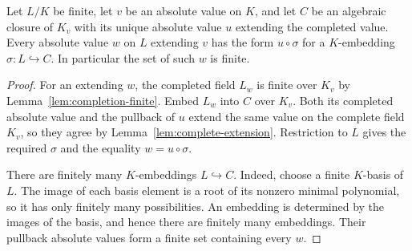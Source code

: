\begin{lemma}
\label{lem:finite-values-via-embeddings}
\leanok
{}
Let $L/K$ be finite, let $v$ be an absolute value on $K$, and let
$C$ be an algebraic closure of $K_v$ with its unique absolute value
$u$ extending the completed value. Every absolute value $w$ on $L$
extending $v$ has the form $u\circ\sigma$ for a $K$-embedding
$\sigma:L\hookrightarrow C$. In particular the set of such $w$ is finite.
\end{lemma}
\begin{proof}
For an extending $w$, the completed field $L_w$ is finite over $K_v$
by Lemma~\ref{lem:completion-finite}. Embed $L_w$ into $C$ over $K_v$.
Both its completed absolute value and the pullback of $u$ extend the
same value on the complete field $K_v$, so they agree by
Lemma~\ref{lem:complete-extension}. Restriction to $L$ gives the required
$\sigma$ and the equality $w=u\circ\sigma$.

There are finitely many $K$-embeddings $L\hookrightarrow C$.
Indeed, choose a finite $K$-basis of $L$. The image of each basis
element is a root of its nonzero minimal polynomial, so it has only
finitely many possibilities. An embedding is determined by the images
of the basis, and hence there are finitely many embeddings. Their
pullback absolute values form a finite set containing every $w$.
\end{proof}

